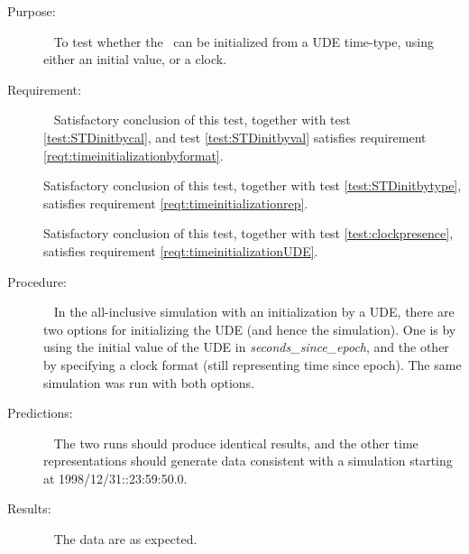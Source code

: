   \label{test:UDEinitbyval}
\begin{description}
\item[Purpose:]\ \newline
To test whether the \timeDesc\ can be initialized from a UDE time-type, using either an initial value, or a clock.

\item[Requirement:]\ \newline
Satisfactory conclusion of this test, together with test \ref{test:STDinitbycal}, and test \ref{test:STDinitbyval} satisfies requirement \ref{reqt:timeinitializationbyformat}.

Satisfactory conclusion of this test, together with test \ref{test:STDinitbytype}, satisfies requirement \ref{reqt:timeinitializationrep}.

Satisfactory conclusion of this test, together with test \ref{test:clockpresence}, satisfies requirement \ref{reqt:timeinitializationUDE}.




\item[Procedure:]\ \newline
In the all-inclusive simulation with an initialization by a UDE, there are two options for initializing the UDE (and hence the simulation).  One is by using the initial value of the UDE in \textit{seconds\_since\_epoch}, and the other by specifying a clock format (still representing time since epoch).  The same simulation was run with both options.

\item[Predictions:]\ \newline
The two runs should produce identical results, and the other time representations should generate data consistent with a simulation starting at 1998/12/31::23:59:50.0.

\item[Results:]\ \newline
The data are as expected.
\end{description}



